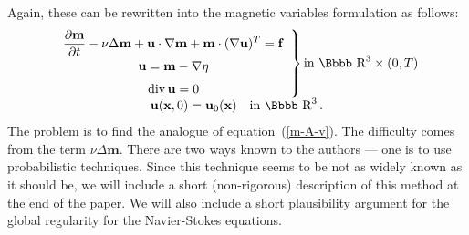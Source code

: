 \documentclass[12pt,twoside]{article}
\renewcommand {\div}{{\rm div}\,}
\newcommand {\rdd}{\mbox{\Bbbb R}}
\newcommand {\bu}{{\mathbf{u}}}
\newcommand {\bff}{{\mathbf{f}}}
\newcommand {\bx}{{\mathbf{x}}}
\newcommand {\bm}{{\mathbf{m}}}
\newcommand {\pder}[2]{\frac {\partial #1}{\partial #2}}
\begin{document}
Again, these can be rewritten into the magnetic variables formulation
as follows:
\begin{equation} \label{navier-stokes-m}%
\begin{array}{c}
\left. \begin{array}{c}
\displaystyle \pder{\bm}{t} -\nu \Delta \bm + \bu\cdot \nabla \bm + \bm \cdot (\nabla \bu)^T = 
  \bff \\[6pt]
\bu = \bm - \nabla \eta \\[6pt]
\div \bu = 0 
\end{array} \right\} {\rm in \ } \rdd^3 \times (0,T) \\[10pt]
\bu(\bx,0) = \bu_0(\bx) \quad {\rm in \ } \rdd^3\, .
\end{array}
\end{equation}
The problem is to find the analogue of equation~(\ref{m-A-v}).  The difficulty
comes from the term $\nu \Delta \bm$.  There are two ways known to the
authors --- one is to use probabilistic techniques.  Since this technique
seems to be not as widely known as it should be, we will include a 
short (non-rigorous) description of this method at the end of the paper.
We will also include a short plausibility argument for the global regularity
for the Navier-Stokes equations.
\end{document}

